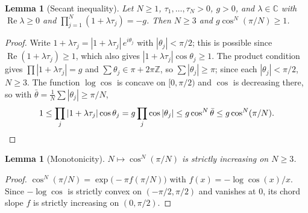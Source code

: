 \documentclass[11pt,a4paper]{article}
\theoremstyle{plain}
\newtheorem{lemma}[theorem]{Lemma}
\theoremstyle{definition}
\theoremstyle{remark}
\newcommand{\C}{\mathbb{C}}
\newcommand{\Real}{\operatorname{Re}}
\begin{document}
\begin{lemma}[Secant inequality]\label{lem:secant}
Let $N\ge1$, $\tau_1,\dots,\tau_N>0$, $g>0$, and $\lambda\in\C$ with $\Real\lambda\ge0$ and
$\prod_{j=1}^N(1+\lambda\tau_j)=-g$. Then $N\ge3$ and $g\cos^N(\pi/N)\ge1$.
\end{lemma}

\begin{proof}
Write $1+\lambda\tau_j=|1+\lambda\tau_j|\,e^{i\theta_j}$ with $|\theta_j|<\pi/2$; this is
possible since $\Real(1+\lambda\tau_j)\ge1$, which also gives
$|1+\lambda\tau_j|\cos\theta_j\ge1$. The product condition gives $\prod|1+\lambda\tau_j|=g$
and $\sum\theta_j\in\pi+2\pi\mathbb{Z}$, so $\sum|\theta_j|\ge\pi$; since each
$|\theta_j|<\pi/2$, $N\ge3$. The function $\log\cos$ is concave on $[0,\pi/2)$ and $\cos$
is decreasing there, so with $\bar\theta=\frac1N\sum|\theta_j|\ge\pi/N$,
\[
  1\le\prod_j|1+\lambda\tau_j|\cos\theta_j=g\prod_j\cos|\theta_j|\le g\cos^N\bar\theta\le
  g\cos^N(\pi/N).
  \qedhere
\]
\end{proof}

\begin{lemma}[Monotonicity]\label{lem:mono}
$N\mapsto\cos^N(\pi/N)$ is strictly increasing on $N\ge3$.
\end{lemma}

\begin{proof}
$\cos^N(\pi/N)=\exp\bigl(-\pi f(\pi/N)\bigr)$ with $f(x)=-\log\cos(x)/x$. Since $-\log\cos$
is strictly convex on $(-\pi/2,\pi/2)$ and vanishes at $0$, its chord slope $f$ is strictly
increasing on $(0,\pi/2)$.
\end{proof}
\end{document}
